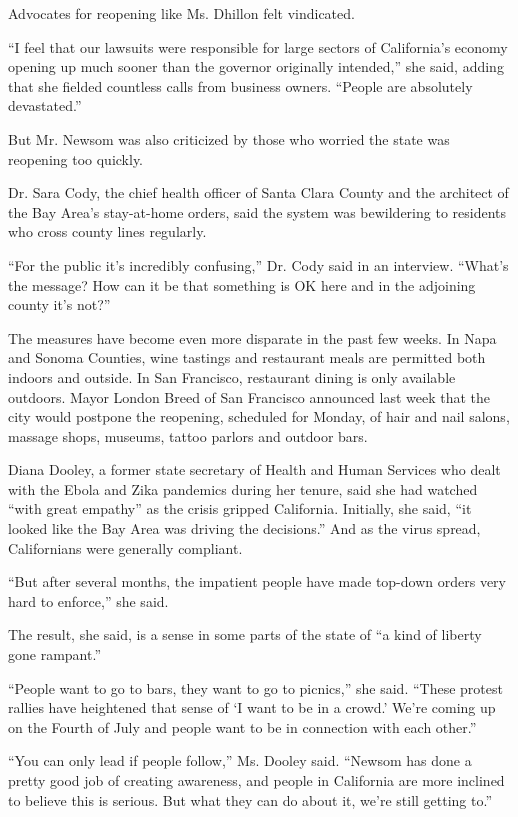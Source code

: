 Advocates for reopening like Ms. Dhillon felt vindicated.

``I feel that our lawsuits were responsible for large sectors of
California's economy opening up much sooner than the governor originally
intended,'' she said, adding that she fielded countless calls from
business owners. ``People are absolutely devastated.''

But Mr. Newsom was also criticized by those who worried the state was
reopening too quickly.

Dr. Sara Cody, the chief health officer of Santa Clara County and the
architect of the Bay Area's stay-at-home orders, said the system was
bewildering to residents who cross county lines regularly.

``For the public it's incredibly confusing,'' Dr. Cody said in an
interview. ``What's the message? How can it be that something is OK here
and in the adjoining county it's not?''

The measures have become even more disparate in the past few weeks. In
Napa and Sonoma Counties, wine tastings and restaurant meals are
permitted both indoors and outside. In San Francisco, restaurant dining
is only available outdoors. Mayor London Breed of San Francisco
announced last week that the city would postpone the reopening,
scheduled for Monday, of hair and nail salons, massage shops, museums,
tattoo parlors and outdoor bars.

Diana Dooley, a former state secretary of Health and Human Services who
dealt with the Ebola and Zika pandemics during her tenure, said she had
watched ``with great empathy'' as the crisis gripped California.
Initially, she said, ``it looked like the Bay Area was driving the
decisions.'' And as the virus spread, Californians were generally
compliant.

``But after several months, the impatient people have made top-down
orders very hard to enforce,'' she said.

The result, she said, is a sense in some parts of the state of ``a kind
of liberty gone rampant.''

``People want to go to bars, they want to go to picnics,'' she said.
``These protest rallies have heightened that sense of `I want to be in a
crowd.' We're coming up on the Fourth of July and people want to be in
connection with each other.''

``You can only lead if people follow,'' Ms. Dooley said. ``Newsom has
done a pretty good job of creating awareness, and people in California
are more inclined to believe this is serious. But what they can do about
it, we're still getting to.''

